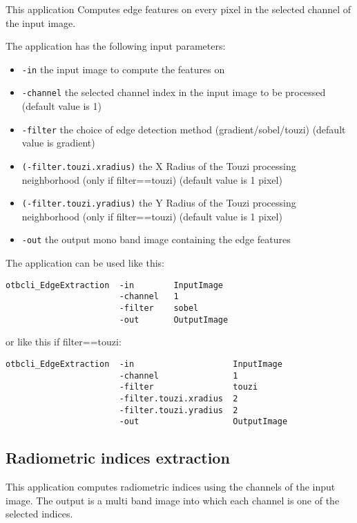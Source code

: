This application Computes edge features on every pixel in the selected channel
of the input image.

The  application has the following input parameters:
\begin{itemize}
\item \verb?-in? the input image to compute the features on
\item \verb?-channel? the selected channel index in the input image to be processed (default value is 1)
\item \verb?-filter? the choice of edge detection method (gradient/sobel/touzi) (default value is gradient)
~~\\
\item \verb?(-filter.touzi.xradius)? the X Radius of the Touzi processing neighborhood (only if filter==touzi) (default value is 1 pixel)
\item \verb?(-filter.touzi.yradius)? the Y Radius of the Touzi processing neighborhood (only if filter==touzi) (default value is 1 pixel)
~~\\
\item \verb?-out? the output mono band image containing the edge features
\end{itemize}


The application can be used like this:
\begin{verbatim}
otbcli_EdgeExtraction  -in        InputImage
                       -channel   1
                       -filter    sobel
                       -out       OutputImage
\end{verbatim}

or like this if filter==touzi:

\begin{verbatim}
otbcli_EdgeExtraction  -in                    InputImage
                       -channel               1
                       -filter                touzi
                       -filter.touzi.xradius  2
                       -filter.touzi.yradius  2 
                       -out                   OutputImage
\end{verbatim}




\subsection{Radiometric indices extraction}\label{ssec:Radiomindextraction}

This application computes radiometric indices using the channels of the input
image. The output is a multi band image into which each channel is one of
the selected indices.


